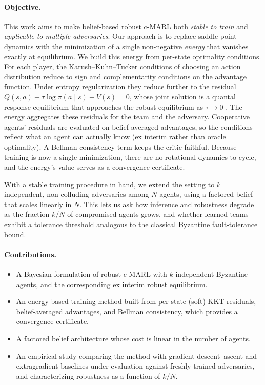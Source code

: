 \paragraph{Objective.}
This work aims to make belief-based robust c-MARL both \emph{stable to train} and
\emph{applicable to multiple adversaries}. Our approach is to replace saddle-point
dynamics with the minimization of a single non-negative \emph{energy} that vanishes
exactly at equilibrium. We build this energy from per-state optimality conditions.
For each player, the Karush--Kuhn--Tucker conditions of choosing an action
distribution reduce to sign and complementarity conditions on the advantage
function. Under entropy regularization they reduce further to the residual
$Q(s,a) - \tau \log \pi(a \mid s) - V(s) = 0$, whose joint solution is a quantal
response equilibrium that approaches the robust equilibrium as $\tau \to 0$
\citep{mckelvey1995quantal,nachum2017pcl}. The energy aggregates these residuals for
the team and the adversary. Cooperative agents' residuals are evaluated on
belief-averaged advantages, so the conditions reflect what an agent can actually
know (ex interim rather than oracle optimality). A Bellman-consistency term keeps
the critic faithful. Because training is now a single minimization, there are no
rotational dynamics to cycle, and the energy's value serves as a convergence
certificate.

With a stable training procedure in hand, we extend the setting to $k$ independent,
non-colluding adversaries among $N$ agents, using a factored belief that scales
linearly in $N$. This lets us ask how inference and robustness degrade as the
fraction $k/N$ of compromised agents grows, and whether learned teams exhibit a
tolerance threshold analogous to the classical Byzantine fault-tolerance bound.

\paragraph{Contributions.}
\begin{itemize}
  \item A Bayesian formulation of robust c-MARL with $k$ independent Byzantine
        agents, and the corresponding ex interim robust equilibrium.
  \item An energy-based training method built from per-state (soft) KKT residuals,
        belief-averaged advantages, and Bellman consistency, which provides a
        convergence certificate.
  \item A factored belief architecture whose cost is linear in the number of agents.
  \item An empirical study comparing the method with gradient descent--ascent and
        extragradient baselines under evaluation against freshly trained
        adversaries, and characterizing robustness as a function of $k/N$.
\end{itemize}

